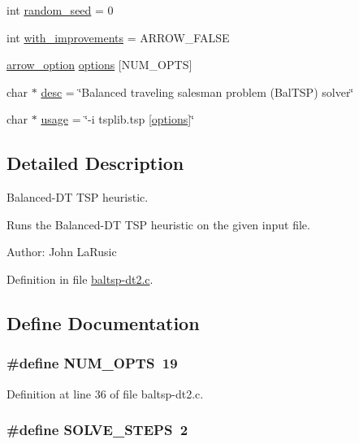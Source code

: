 \begin{CompactItemize}
\item 
int \hyperlink{bin_2baltsp-dt2_8c_d9059bc845096b2f05414a66c836b4ee}{random\_\-seed} = 0
\item 
int \hyperlink{bin_2baltsp-dt2_8c_91079460b00ac08193d5ee47094f8f70}{with\_\-improvements} = ARROW\_\-FALSE
\item 
\hyperlink{structarrow__option}{arrow\_\-option} \hyperlink{bin_2baltsp-dt2_8c_cea6a9709d519c143f30db401a0d0c72}{options} \mbox{[}NUM\_\-OPTS\mbox{]}
\item 
char $\ast$ \hyperlink{bin_2baltsp-dt2_8c_3aad16fd4bea1b9717f232ea75ad6449}{desc} = \char`\"{}Balanced traveling salesman problem (BalTSP) solver\char`\"{}
\item 
char $\ast$ \hyperlink{bin_2baltsp-dt2_8c_adebe2487a2c5240ab6cd02c83add0bf}{usage} = \char`\"{}-i tsplib.tsp \mbox{[}\hyperlink{tourinfo_8c_cea6a9709d519c143f30db401a0d0c72}{options}\mbox{]}\char`\"{}
\end{CompactItemize}


\subsection{Detailed Description}
Balanced-DT TSP heuristic. 

Runs the Balanced-DT TSP heuristic on the given input file.

\begin{Desc}
\item[Author:]John LaRusic \end{Desc}


Definition in file \hyperlink{bin_2baltsp-dt2_8c-source}{baltsp-dt2.c}.

\subsection{Define Documentation}
\hypertarget{bin_2baltsp-dt2_8c_9b58b2c4af931c8486a986c9deca40f5}{
\subsubsection[{NUM\_\-OPTS}]{\setlength{\rightskip}{0pt plus 5cm}\#define NUM\_\-OPTS~19}}
\label{bin_2baltsp-dt2_8c_9b58b2c4af931c8486a986c9deca40f5}




Definition at line 36 of file baltsp-dt2.c.\hypertarget{bin_2baltsp-dt2_8c_ceebcce8f411269df7b99e78247d7497}{
\subsubsection[{SOLVE\_\-STEPS}]{\setlength{\rightskip}{0pt plus 5cm}\#define SOLVE\_\-STEPS~2}}
\label{bin_2baltsp-dt2_8c_ceebcce8f411269df7b99e78247d7497}




